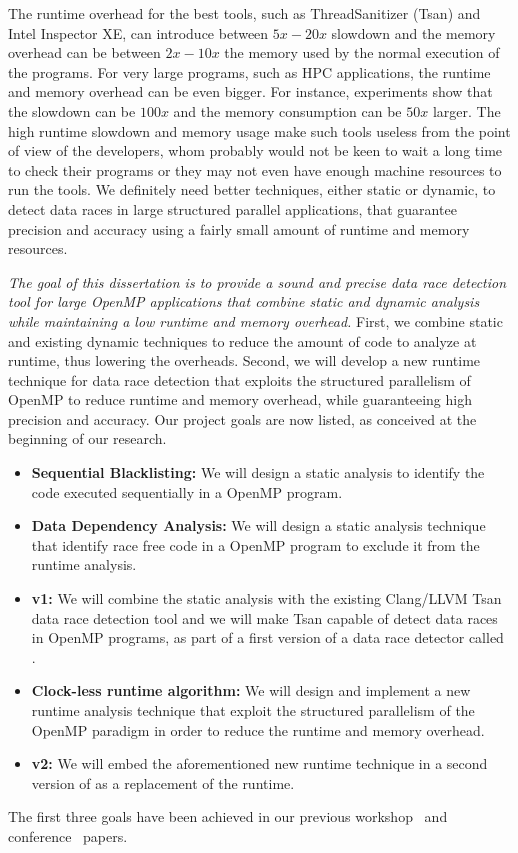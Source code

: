 The runtime overhead for the best tools, such as ThreadSanitizer (Tsan) and
Intel Inspector XE, can introduce between $5x-20x$ slowdown and the memory
overhead can be between $2x-10x$ the memory used by the normal execution of
the programs.
%
For very large programs, such as HPC applications, the runtime and memory
overhead can be even bigger.
%
For instance, experiments show that the slowdown can be $100x$
and the memory consumption can be $50x$ larger.
%
The high runtime slowdown and memory usage make such tools useless from the
point of view of the developers, whom probably would not be keen to wait a
long time to check their programs or they may not even have enough machine
resources to run the tools.
%
We definitely need better techniques, either static or dynamic, to detect data
races in large structured parallel applications, that guarantee precision and
accuracy using a fairly small amount of runtime and memory resources.

\emph{The goal of this dissertation is to provide a sound and precise data
  race detection tool for large OpenMP applications that combine static and
  dynamic analysis while maintaining a low runtime and memory overhead.}
%
First, we combine static and existing dynamic techniques to reduce the amount
of code to analyze at runtime, thus lowering the overheads.
%
Second, we will develop a new runtime technique for data race detection that
exploits the structured parallelism of OpenMP to reduce runtime and memory
overhead, while guaranteeing high precision and accuracy.
%
Our project goals are now listed, as conceived at the beginning of our
research.

\begin{itemize}
\item \textbf{Sequential Blacklisting:} We will design a static analysis to
  identify the code executed sequentially in a OpenMP program.
\item \textbf{Data Dependency Analysis:} We will design a static analysis
  technique that identify race free code in a OpenMP program to exclude it
  from the runtime analysis.
\item \textbf{\archer v1:} We will combine the static analysis with the
  existing Clang/LLVM Tsan data race detection tool and we will make Tsan
  capable of detect data races in OpenMP programs, as part of a first version
  of a data race detector called \archer.
\item \textbf{Clock-less runtime algorithm:} We will design and implement a
  new runtime analysis technique that exploit the structured parallelism of
  the OpenMP paradigm in order to reduce the runtime and memory overhead.
\item \textbf{\archer v2:} We will embed the aforementioned new runtime
  technique in a second version of \archer as a replacement of the \tsan
  runtime.
\end{itemize}

The first three goals have been achieved in our previous
workshop~\cite{Protze:2014:TPL:2688361.2688369} and
conference~\cite{atzeni2016} papers.

